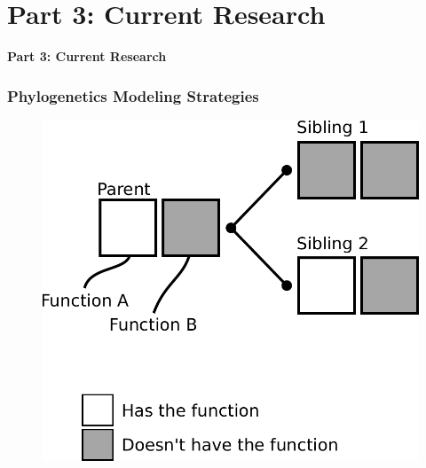 \documentclass[aspectratio=169, 9pt, handout]{beamer}
\begin{document}
\section{Part 3: Current Research}

\begin{frame}[t]
	\textcolor{uscgold}{
		\Large {\bf Part 3: Current Research}
	}
\end{frame}

\begin{frame}
	\frametitle{Phylogenetics Modeling Strategies}
	
	\begin{minipage}[m]{.3\linewidth}

	\begin{figure}
	\includegraphics[width=.9\linewidth]{phylo-model-overview-legend.pdf}
	\end{figure}
	\end{minipage}\hfill
	\begin{minipage}[m]{.69\linewidth}
	

\end{minipage}
\end{frame}
\end{document}
